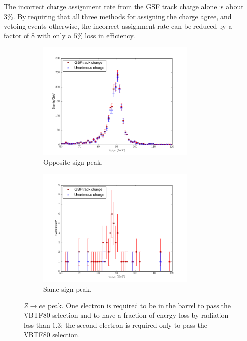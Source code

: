 The incorrect charge assignment rate from the GSF track charge alone is about
$3\%$.  By requiring that all three methods for assigning the charge
agree, and vetoing events otherwise, the incorrect assignment rate can be
reduced by a factor of 8 with only a $5\%$ loss in efficiency.

\begin{figure}[htbp]
  \centering
  \begin{subfigure}{\textwidth}
    \centering
    \includegraphics[width=0.85\textwidth]{zpeak_os}
    \caption{Opposite sign \PZ peak.}
    \label{fig:zpeak_os}
  \end{subfigure}
  \begin{subfigure}{\textwidth}
    \centering
    \includegraphics[width=0.85\textwidth]{zpeak_ss}
    \caption{Same sign \PZ peak.}
    \label{fig:zpeak_ss}
  \end{subfigure}
  \caption{ $Z\rightarrow ee$ peak. One electron is required to be in the
barrel to pass the VBTF80 selection and to have a fraction of energy loss by
radiation less than 0.3; the second electron is required only to pass the VBTF80
selection.}\label{fig:zpeak} 
\end{figure}

